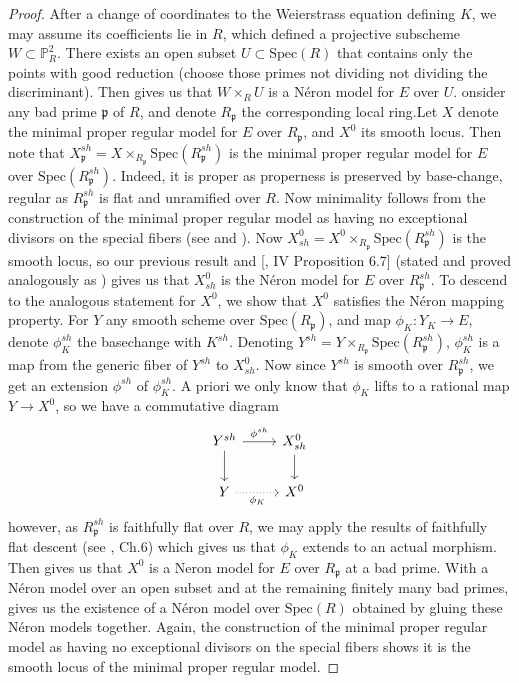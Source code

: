 \documentclass{article}
\theoremstyle{definition}
\theoremstyle{remark}
\theoremstyle{plain}
\newcommand{\mb}[1]{\mathbb{#1}}
\newcommand{\mk}[1]{\mathfrak{#1}}
\begin{document}
\begin{proof}
	After a change of coordinates to the Weierstrass equation defining $K$, we may assume its coefficients lie in $R$, which defined a projective subscheme $W \subset \mb{P}^2_R$.
	There exists an open subset $U \subset \text{Spec}(R)$ that contains only the points with good reduction (choose those primes not dividing not dividing the discriminant).
	Then  gives us that $W \times_R U$ is a N\'eron model for $E$ over $U$. \newline
	\indent onsider any bad prime $\mk{p}$ of $R$, and denote $R_{\mk{p}}$ the corresponding local ring.Let $X$ denote the minimal proper regular model for $E$ over $R_{\mk{p}}$, and $X^0$ its smooth locus.
	Then note that $X_{\mk{p}}^{sh} = X \times_{R_{\mk{p}}} \text{Spec}(R_{\mk{p}}^{sh})$ is the minimal proper regular model for $E$ over $\text{Spec}(R_{\mk{p}}^{sh})$.
	Indeed, it is proper as properness is preserved by base-change, regular as $R_{\mk{p}}^{sh}$ is flat and unramified over $R$.
	Now minimality follows from the construction of the minimal proper regular model as having no exceptional divisors on the special fibers (see \cite{Licht} and \cite{Shaf}).
	Now $X^0_{sh} = X^0 \times_{R_{\mk{p}}} \text{Spec}(R_{\mk{p}}^{sh})$ is the smooth locus, so our previous result  and [\cite{AEC2}, IV Proposition 6.7] (stated and proved analogously as ) gives us that $X^0_{sh}$ is the N\'eron model for $E$ over $R_{\mk{p}}^{sh}$.
	To descend to the analogous statement for $X^0$, we show that $X^0$ satisfies the N\'eron mapping property.
	For $Y$ any smooth scheme over $\text{Spec}(R_{\mk{p}})$, and map $\phi_K: Y_K \to E$, denote $\phi_K^{sh}$ the basechange with $K^{sh}$.
	Denoting $Y^{sh} =Y \times_{R_{\mk{p}}} \text{Spec}(R_{\mk{p}}^{sh})$, $\phi_K^{sh}$  is a map from the generic fiber of $Y^{sh}$ to $X^0_{sh}$.
	Now since $Y^{sh}$ is smooth over $R_{\mk{p}}^{sh}$, we get an extension $\phi^{sh}$ of $\phi_K^{sh}$.
	A priori we only know that $\phi_K$ lifts to a rational map $Y \to X^0$, so we have a commutative diagram
\[\begin{tikzcd}
	{Y^{sh}} & {X^0_{sh}} \\
	Y & {X^0}
	\arrow["{\phi^{sh}}", from=1-1, to=1-2]
	\arrow[from=1-1, to=2-1]
	\arrow[from=1-2, to=2-2]
	\arrow["{\phi_K}"', dotted, from=2-1, to=2-2]
\end{tikzcd}\]
however, as $R_{\mk{p}}^{sh}$ is faithfully flat over $R$, we may apply the results of faithfully flat descent (see \cite{BLR}, Ch.6) which gives us that $\phi_K$ extends to an actual morphism.
Then  gives us that $X^0$ is a N\;eron model for $E$ over $R_{\mk{p}}$ at a bad prime.\newline
\indent With a N\'eron model over an open subset and at the remaining finitely many bad primes,  gives us the existence of a N\'eron model over $\text{Spec}(R)$ obtained by gluing these N\'eron models together.
Again, the construction of the minimal proper regular model as having no exceptional divisors on the special fibers shows it is the smooth locus of the minimal proper regular model. 
\end{proof}
\end{document}
